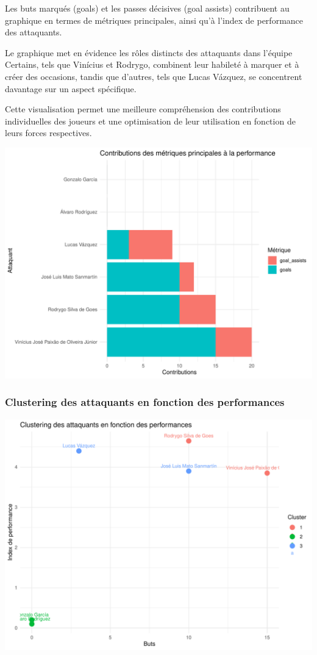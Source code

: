 \documentclass[
  6pt,
]{article}
\begin{document}
Les buts marqués (goals) et les passes décisives (goal assists)
contribuent au graphique en termes de métriques principales, ainsi qu'à
l'index de performance des attaquants.

Le graphique met en évidence les rôles distincts des attaquants dans
l'équipe Certains, tels que Vinícius et Rodrygo, combinent leur habileté
à marquer et à créer des occasions, tandis que d'autres, tels que Lucas
Vázquez, se concentrent davantage sur un aspect spécifique.

Cette visualisation permet une meilleure compréhension des contributions
individuelles des joueurs et une optimisation de leur utilisation en
fonction de leurs forces respectives.

\begin{center}\includegraphics[width=0.8\linewidth]{Analyse_Impact_Performances_Joueurs_files/figure-latex/Contributions metrics-forwards-1} \end{center}

\subsubsection{Clustering des attaquants en fonction des
performances}\label{clustering-des-attaquants-en-fonction-des-performances}

\begin{center}\includegraphics[width=0.8\linewidth]{Analyse_Impact_Performances_Joueurs_files/figure-latex/Clustering-forwards-1} \end{center}
\end{document}
